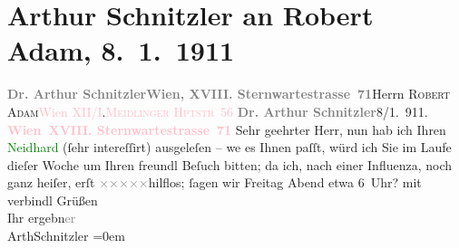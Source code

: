 

               \section[Arthur Schnitzler an Robert Adam, 8. 1. 1911]{ Arthur Schnitzler an Robert Adam, 8. 1. 1911}\nopagebreak{}\rehead{ }\normalsize\beginnumbering{} \toendnotes[C]{\smallbreak\pagebreak[2]} 
\pstart{}{\pb}\textcolor{gray}{\textbf{Dr. Arthur Schnitzler}}\pend{}\pstart{}\textcolor{pink}{\textcolor{gray}{\textbf{Wien, XVIII. Sternwartestrasse 71}}}{}\ledrightnote{\textcolor{pink}{Sternwartestraße}}\pend{}{\bigskip}\pstart{}{\pb}Herrn \textsc{Robert Adam}\pend{}\pstart{}\textcolor{pink}{Wien XII/I}{}\ledrightnote{\textcolor{pink}{XII., Meidling}}.\pend{}\pstart{}\textcolor{pink}{\textsc{Meidlinger Hptstr} 56}{}\ledrightnote{\textcolor{pink}{Meidlinger Hauptstraße}}\pend{}{\bigskip}\pstart
           \noindent{}{\pb}\textcolor{gray}{\textbf{Dr. Arthur Schnitzler}}\hfill 8/1. 911.\pend
           \pstart
           \textcolor{gray}{\textbf{\textcolor{pink}{Wien XVIII. Sternwartestrasse 71}{}\ledrightnote{\textcolor{pink}{Sternwartestraße}}}}\pend
           \pstart\center{}Sehr geehrter Herr,\pend\pstart
           nun hab ich Ihren \textcolor{green}{Neidhard}{}\ledrightnote{\textcolor{green}{Neidhard}} (ſehr intereſſirt)
                    ausgeleſen – we{\geminationn} es Ihnen paſſt, würd ich Sie im
                    Laufe dieſer Woche um Ihren freundl Beſuch bitten; da ich, nach einer Influenza,
                        {\pb}noch ganz heiſer, erſt \textcolor{gray}{×}\-\textcolor{gray}{×}\-\textcolor{gray}{×}\-\textcolor{gray}{×}\-\textcolor{gray}{×}hilflos; ſagen wir Freitag{ }Abend etwa 6 Uhr?\pend
           \pstart
           mit verbindl Grüßen{\\[\baselineskip]}Ihr ergebn\textcolor{gray}{er}{\\[\baselineskip]}\spacefill\mbox{ArthSchnitzler}\pend
           \leftskip=0em{}\endnumbering{}  
      